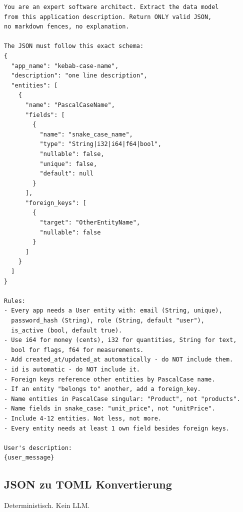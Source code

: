 \documentclass[11pt,a4paper]{article}
\begin{document}
\begin{lstlisting}[language={}]
You are an expert software architect. Extract the data model
from this application description. Return ONLY valid JSON,
no markdown fences, no explanation.

The JSON must follow this exact schema:
{
  "app_name": "kebab-case-name",
  "description": "one line description",
  "entities": [
    {
      "name": "PascalCaseName",
      "fields": [
        {
          "name": "snake_case_name",
          "type": "String|i32|i64|f64|bool",
          "nullable": false,
          "unique": false,
          "default": null
        }
      ],
      "foreign_keys": [
        {
          "target": "OtherEntityName",
          "nullable": false
        }
      ]
    }
  ]
}

Rules:
- Every app needs a User entity with: email (String, unique),
  password_hash (String), role (String, default "user"),
  is_active (bool, default true).
- Use i64 for money (cents), i32 for quantities, String for text,
  bool for flags, f64 for measurements.
- Add created_at/updated_at automatically - do NOT include them.
- id is automatic - do NOT include it.
- Foreign keys reference other entities by PascalCase name.
- If an entity "belongs to" another, add a foreign_key.
- Name entities in PascalCase singular: "Product", not "products".
- Name fields in snake_case: "unit_price", not "unitPrice".
- Include 4-12 entities. Not less, not more.
- Every entity needs at least 1 own field besides foreign keys.

User's description:
{user_message}
\end{lstlisting}

\subsection{JSON zu TOML Konvertierung}

Deterministisch. Kein LLM.
\end{document}
